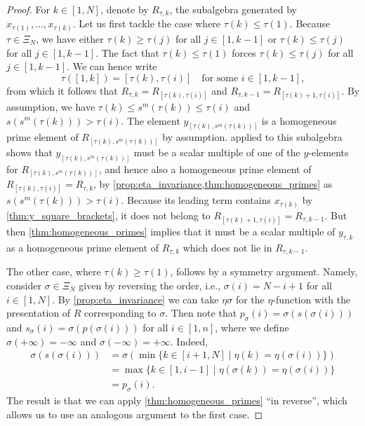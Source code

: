\begin{proof}

	For $k \in [1, N]$, denote by $R_{\tau, k}$, the subalgebra generated by $x_{\tau(1)},
		\dots, x_{\tau(k)}$. Let us first tackle the case where $\tau(k) \leq \tau(1)$. Because
	$\tau \in \Xi_N$, we have either $\tau(k) \geq \tau(j)$ for all $j\in [1, k - 1]$ or
	$\tau(k) \leq \tau(j)$ for all $j \in [1, k-1]$. The fact that $\tau(k) \leq \tau(1)$
	forces $\tau(k) \leq \tau(j)$ for all $j \in [1, k-1]$. We can hence write
	\begin{equation*}
		\tau([1, k]) = [\tau(k), \tau(i)] \quad \text{for some } i \in [1, k-1],
	\end{equation*}
	from which it follows that $R_{\tau, k} = R_{[\tau(k), \tau(i)]}$ and $R_{\tau, k-1} = R_{[\tau(k) + 1,\tau(i)]}$.
	By assumption, we have $\tau(k) \leq s^m(\tau(k)) \leq \tau(i)$ and $s (s^m(\tau(k))) >
		\tau(i)$. The element $y_{[\tau(k), s^m(\tau(k))]}$ is a homogeneous prime element of
	$R_{[\tau(k), s^m(\tau(k))]}$ by assumption.  applied to
	this subalgebra shows that $y_{[\tau(k), s^m(\tau(k))]}$ must be a scalar multiple of
	one of the $y$-elements for $R_{[\tau(k), s^m(\tau(k))]}$, and hence also a homogeneous
	prime element of $R_{[\tau(k), \tau(i)]} = R_{\tau, k}$, by
	\cref{prop:eta_invariance,thm:homogeneous_primes} as $s(s^m(\tau(k))) > \tau(i)$.
	Because its leading term contains $x_{\tau(k)}$ by \cref{thm:y_square_brackets}, it
	does not belong to $R_{[\tau(k) + 1, \tau(i)]} = R_{\tau, k-1}$. But then
	\cref{thm:homogeneous_primes} implies that it must be a scalar multiple of $y_{\tau,
				k}$ as a homogeneous prime element of $R_{\tau, k}$ which does not lie in $R_{\tau,
				k-1}$.

	The other case, where $\tau(k) \geq \tau(1)$, follows by a symmetry argument. Namely,
	consider $\sigma \in \Xi_N$ given by reversing the order, i.e., $\sigma(i) = N- i + 1$
	for all $i \in [1, N]$. By \cref{prop:eta_invariance} we can take $\eta \sigma$ for the
	$\eta$-function with the presentation of $R$ corresponding to $\sigma$. Then note that
	$p_\sigma (i) = \sigma (s(\sigma(i)))$ and $s_\sigma (i) = \sigma(p(\sigma(i)))$ for
	all $i\in [1, n]$, where we define $\sigma(+\infty) = -\infty$ and $\sigma(-\infty) =
		+\infty$. Indeed,
	\begin{align*}
		\sigma(s(\sigma(i))) & = \sigma\left(\min \{k \in [i+1, N]\mid \eta(k) = \eta(\sigma(i))\}\right) \\
		                     & = \max\{k \in [1, i-1] \mid \eta(\sigma(k)) = \eta(\sigma(i))\}            \\
		                     & = p_\sigma(i).
	\end{align*}
	The result is that we can apply \cref{thm:homogeneous_primes} ``in reverse'', which
	allows us to use an analogous argument to the first case.
\end{proof}

